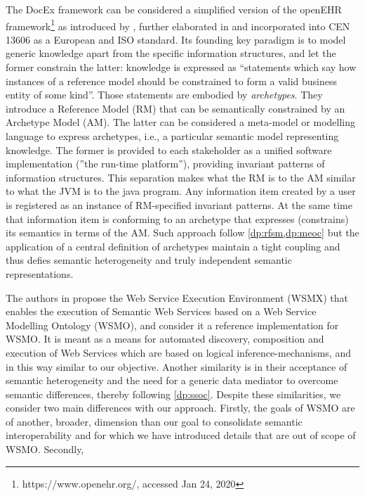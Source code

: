\documentclass[sort&compress,preprint,authoryear,3p,twocolumn]{elsarticle}
\begin{document}
The DocEx framework can be considered a simplified version of the
openEHR framework\footnote{https://www.openehr.org/, accessed Jan 24,
  2020} as introduced by \cite{Beale:2001vz}, further elaborated in
\citep{Beale2007a, Beale2008a, Beale2007, Beale2008, Beale2007b, Beale2007c}
and incorporated into CEN 13606 as a European and ISO standard. Its
founding key paradigm is to model generic knowledge apart from the
specific information structures, and let the former constrain the
latter: knowledge is expressed as ``statements which say how instances
of a reference model should be constrained to form a valid business
entity of some kind''. Those statements are embodied by
\emph{archetypes}. They introduce a Reference Model (RM) that can be
semantically constrained by an Archetype Model (AM). The latter can be
considered a meta-model or modelling language to express archetypes,
i.e., a particular semantic model representing knowledge. The former is
provided to each stakeholder as a unified software implementation (''the
run-time platform''), providing invariant patterns of information
structures. This separation makes what the RM is to the AM similar to
what the JVM is to the java program. Any information item created by a
user is registered as an instance of RM-specified invariant patterns. At
the same time that information item is conforming to an archetype that
expresses (constrains) its semantics in terms of the AM. Such approach
follow \cref{dp:rfsm,dp:meoc} but the application of a central
definition of archetypes maintain a tight coupling and thus defies
semantic heterogeneity and truly independent semantic representations.

The authors in \citep{Haller2005} propose the Web Service Execution
Environment (WSMX) that enables the execution of Semantic Web Services
based on a Web Service Modelling Ontology (WSMO), and consider it a
reference implementation for WSMO. It is meant as a means for automated
discovery, composition and execution of Web Services which are based on
logical inference-mechanisms, and in this way similar to our objective.
Another similarity is in their acceptance of semantic heterogeneity and
the need for a generic data mediator to overcome semantic differences,
thereby following \cref{dp:ssoc}. Despite these similarities, we
consider two main differences with our approach. Firstly, the goals of
WSMO are of another, broader, dimension than our goal to consolidate
semantic interoperability and for which we have introduced details that
are out of scope of WSMO. Secondly,
\end{document}
